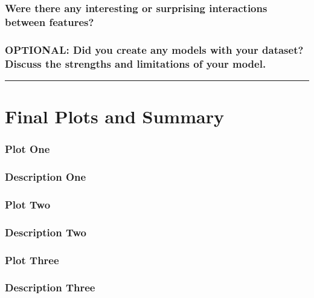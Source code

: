 \documentclass[]{article}
\begin{document}
\subsubsection{Were there any interesting or surprising interactions
between
features?}\label{were-there-any-interesting-or-surprising-interactions-between-features}

\subsubsection{OPTIONAL: Did you create any models with your dataset?
Discuss the strengths and limitations of your
model.}\label{optional-did-you-create-any-models-with-your-dataset-discuss-the-strengths-and-limitations-of-your-model.}

\begin{center}\rule{0.5\linewidth}{\linethickness}\end{center}

\section{Final Plots and Summary}\label{final-plots-and-summary}

\subsubsection{Plot One}\label{plot-one}

\subsubsection{Description One}\label{description-one}

\subsubsection{Plot Two}\label{plot-two}

\subsubsection{Description Two}\label{description-two}

\subsubsection{Plot Three}\label{plot-three}

\subsubsection{Description Three}\label{description-three}
\end{document}
